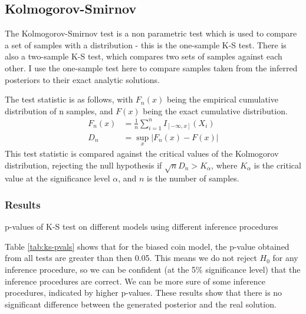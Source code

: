 \subsection{Kolmogorov-Smirnov}
				
The Kolmogorov-Smirnov test is a non parametric test which is used to compare a set of samples with a distribution - this is the one-sample K-S test. There is also a two-sample K-S test, which compares two sets of samples against each other. I use the one-sample test here to compare samples taken from the inferred posteriors to their exact analytic solutions.
				
The test statistic is as follows, with $F_n(x)$ being the empirical cumulative distribution of n samples, and $F(x)$ being the exact cumulative distribution.
\begin{align*}
	F_{n}(x) & =\frac{1}{n}\sum_{i=1}^{n}I_{[-\infty ,x]}(X_{i}) \\
	D_{n}    & =\sup_{x}|F_{n}(x)-F(x)|                          
\end{align*}
This test statistic is compared against the critical values of the Kolmogorov distribution, rejecting the null hypothesis if $\sqrt{n}D_n > K_\alpha$, where $K_\alpha$ is the critical value at the significance level $\alpha$, and $n$ is the number of samples.

\subsubsection{Results}

\begin{table}[!ht]
	\centering
	\normal
	\pgfplotstabletranspose[colnames from = 0]\transpose\normal
	\pgfplotstabletypeset[
		string type,
		every head row/.style={before row=\toprule, after row=\midrule},
		every last row/.style={after row=\bottomrule},
		every col no 0/.style={
			string type,
			column name={Inference Method},
			column type={@{}l}},
		every col no 1/.style={
			column type={c@{}},
			precision=3,
			fixed zerofill=true
		},
	]\transpose
	\caption{p-values of K-S test on different models using different inference procedures}
	\label{tab:ks-pvals}
\end{table}
Table \ref{tab:ks-pvals} shows that for the biased coin model, the p-value obtained from all tests are greater than then 0.05. This means we do not reject $H_0$ for any inference procedure, so we can be confident (at the 5\% significance level) that the inference procedures are correct. We can be more sure of some inference procedures, indicated by higher p-values. These results show that there is no significant difference between the generated posterior and the real solution.
		
